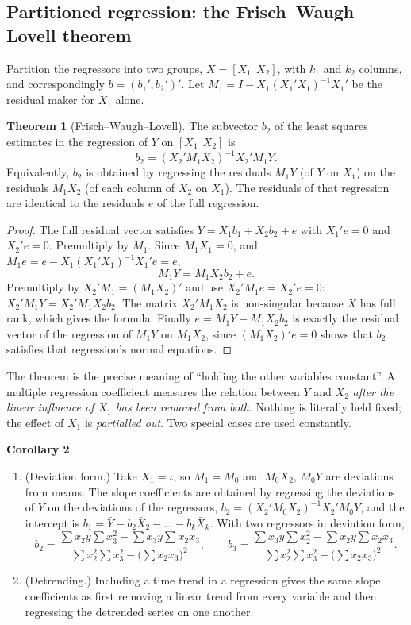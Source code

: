 \documentclass[11pt,a4paper]{article}
\numberwithin{equation}{section}
\theoremstyle{definition}
\newtheorem{thm}{Theorem}[subsection]
\newtheorem{coro}[thm]{Corollary}
\begin{document}
\subsection{Partitioned regression: the Frisch--Waugh--Lovell theorem}
\label{ssec:fwl}

Partition the regressors into two groups, $X = [X_1\ \ X_2]$, with $k_1$ and $k_2$ columns, and correspondingly $b = (b_1', b_2')'$. Let
$M_1 = I - X_1(X_1'X_1)^{-1}X_1'$ be the residual maker for $X_1$ alone.

\begin{thm}[Frisch--Waugh--Lovell]
\label{thm:fwl}
The subvector $b_2$ of the least squares estimates in the regression of $Y$ on $[X_1\ \ X_2]$ is
\[
b_2 = (X_2'M_1X_2)^{-1}X_2'M_1Y .
\]
Equivalently, $b_2$ is obtained by regressing the residuals $M_1Y$ (of $Y$ on $X_1$) on the residuals $M_1X_2$ (of each column of $X_2$ on $X_1$). The
residuals of that regression are identical to the residuals $e$ of the full regression.
\end{thm}

\begin{proof}
The full residual vector satisfies $Y = X_1b_1 + X_2b_2 + e$ with $X_1'e = 0$ and $X_2'e = 0$. Premultiply by $M_1$. Since $M_1X_1 = 0$, and
$M_1e = e - X_1(X_1'X_1)^{-1}X_1'e = e$,
\[
M_1Y = M_1X_2b_2 + e .
\]
Premultiply by $X_2'M_1 = (M_1X_2)'$ and use $X_2'M_1e = X_2'e = 0$: $X_2'M_1Y = X_2'M_1X_2b_2$. The matrix $X_2'M_1X_2$ is non-singular because $X$ has
full rank, which gives the formula. Finally $e = M_1Y - M_1X_2b_2$ is exactly the residual vector of the regression of $M_1Y$ on $M_1X_2$, since
$(M_1X_2)'e = 0$ shows that $b_2$ satisfies that regression's normal equations.
\end{proof}

The theorem is the precise meaning of ``holding the other variables constant''. A multiple regression coefficient measures the relation between $Y$
and $X_2$ \emph{after the linear influence of $X_1$ has been removed from both}. Nothing is literally held fixed; the effect of $X_1$ is
\emph{partialled out}. Two special cases are used constantly.

\begin{coro}
\label{thm:deviation}
\begin{enumerate}[label=(\roman*)]
\item (Deviation form.) Take $X_1 = \iota$, so $M_1 = M_0$ and $M_0X_2$, $M_0Y$ are deviations from means. The slope coefficients are obtained by regressing
the deviations of $Y$ on the deviations of the regressors, $b_2 = (X_2'M_0X_2)^{-1}X_2'M_0Y$, and the intercept is
$b_1 = \bar Y - b_2\bar X_2 - \dots - b_k\bar X_k$. With two regressors in deviation form,
\[
b_2 = \frac{\sum x_2y\sum x_3^2 - \sum x_3y\sum x_2x_3}{\sum x_2^2\sum x_3^2 - \bigl(\sum x_2x_3\bigr)^2}, \qquad
b_3 = \frac{\sum x_3y\sum x_2^2 - \sum x_2y\sum x_2x_3}{\sum x_2^2\sum x_3^2 - \bigl(\sum x_2x_3\bigr)^2} .
\]
\item (Detrending.) Including a time trend in a regression gives the same slope coefficients as first removing a linear trend from every
variable and then regressing the detrended series on one another.
\end{enumerate}
\end{coro}
\end{document}
